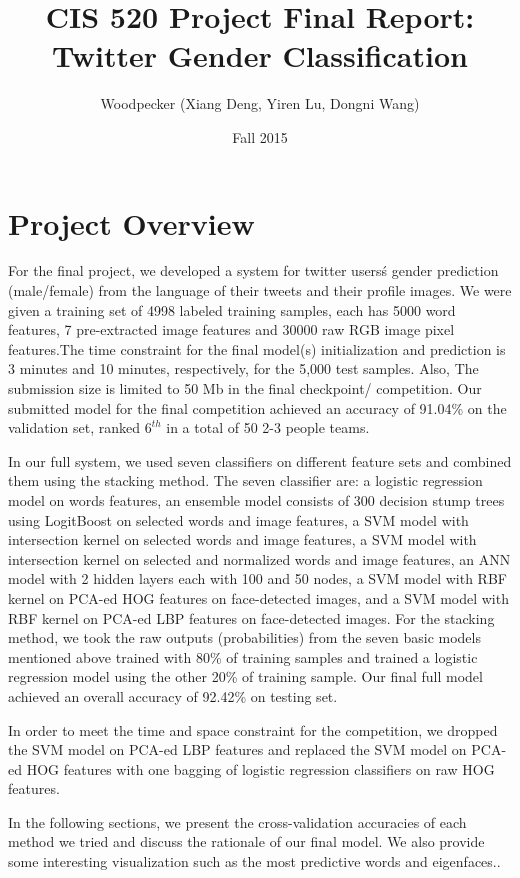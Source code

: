 \documentclass[english]{article}
\title{CIS 520 Project Final Report: Twitter Gender Classification}
\author{Woodpecker (Xiang Deng, Yiren Lu, Dongni Wang)}
\date{Fall 2015}
\begin{document}
\maketitle
\section{Project Overview}
\indent \indent For the final project, we developed a system for twitter users\'s gender prediction (male/female) from the language of their tweets and their profile images. We were given a training set of 4998 labeled training samples, each has 5000 word features, 7 pre-extracted image features and 30000 raw RGB image pixel features.The time constraint for the final model(s) initialization and prediction is 3 minutes and 10 minutes, respectively, for the 5,000 test samples. Also, The submission size is limited to 50 Mb in the final checkpoint/ competition. Our submitted model for the final competition achieved an accuracy of 91.04\% on the validation set, ranked $6^{th}$ in a total of 50 2-3 people teams. \par
In our full system, we used seven classifiers on different feature sets and combined them using the stacking method.
The seven classifier are: a logistic regression model on words features, an ensemble model consists of 300 decision stump trees using LogitBoost on selected words and image features, a SVM model with intersection kernel on selected words and image features, a SVM model with intersection kernel on selected and normalized words and image features, an ANN model with 2 hidden layers each with 100 and 50 nodes, a SVM model with RBF kernel on PCA-ed HOG features on face-detected images, and a SVM model with RBF kernel on PCA-ed LBP features on face-detected images. For the stacking method, we took the raw outputs (probabilities) from the seven basic models mentioned above trained with 80\% of training samples and trained a logistic regression model using the other 20\% of training sample. Our final full model achieved an overall accuracy of 92.42\% on testing set. \par
In order to meet the time and space constraint for the competition, we dropped the SVM model on PCA-ed LBP features and replaced the SVM model on PCA-ed HOG features with one bagging of logistic regression classifiers on raw HOG features. \par
In the following sections, we present the cross-validation accuracies of each method we tried and discuss the rationale of our final model. We also provide some interesting visualization such as the most predictive words and eigenfaces.. 
\end{document}
